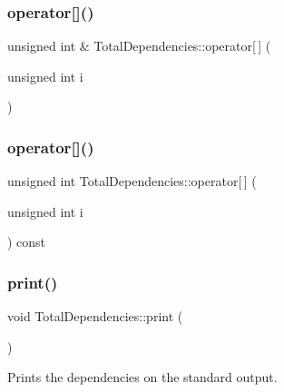 \subsubsection{\texorpdfstring{operator[]()}{operator[]()}\hspace{0.1cm}{\footnotesize\ttfamily [1/2]}}
{\footnotesize\ttfamily unsigned int \& Total\+Dependencies\+::operator\mbox{[}$\,$\mbox{]} (\begin{DoxyParamCaption}\item[{unsigned int}]{i }\end{DoxyParamCaption})}

\mbox{\label{class_total_dependencies_ad684b13fac0f7474fa68880ef9f5a30a}} 
\subsubsection{\texorpdfstring{operator[]()}{operator[]()}\hspace{0.1cm}{\footnotesize\ttfamily [2/2]}}
{\footnotesize\ttfamily unsigned int Total\+Dependencies\+::operator\mbox{[}$\,$\mbox{]} (\begin{DoxyParamCaption}\item[{unsigned int}]{i }\end{DoxyParamCaption}) const}

\mbox{\label{class_total_dependencies_abd5c49f26000acb2c45d8b967922c7e7}} 
\subsubsection{\texorpdfstring{print()}{print()}}
{\footnotesize\ttfamily void Total\+Dependencies\+::print (\begin{DoxyParamCaption}{ }\end{DoxyParamCaption})}



Prints the dependencies on the standard output. 

\mbox{\label{class_total_dependencies_a514df10fe452f2000ceec5e279eae802}} 
